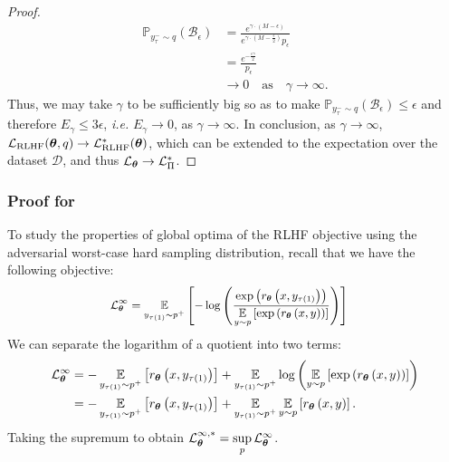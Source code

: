\begin{proof}
\begin{equation*}
\begin{aligned}
\mathbb{P}_{y^{-}_{\tau}\sim q}(\mathcal{B}_{\epsilon})&=\frac{e^{\gamma\cdot\left(M-\epsilon\right)}}{e^{\gamma\cdot\left(M-\frac{\epsilon}{2}\right)}p_{\epsilon}} \\
&= \frac{e^{-\frac{\epsilon\gamma}{2}}}{p_{\epsilon}} \\
&\rightarrow 0 \quad\text{as}\quad \gamma\rightarrow\infty.
\end{aligned}
\end{equation*}
Thus, we may take $\gamma$ to be sufficiently big so as to make $\mathbb{P}_{y^{-}_{\tau}\sim q}(\mathcal{B}_{\epsilon})\leq\epsilon$ and therefore $E_{\gamma}\leq3\epsilon$, \textit{i.e.} $E_{\gamma}\rightarrow0$, as $\gamma\rightarrow\infty$. In conclusion, as $\gamma \rightarrow \infty$, $\mathcal{L}_{\text{RLHF}}({\boldsymbol{\theta}},q)\rightarrow\mathcal{L}_{\text{RLHF}}^{*}({\boldsymbol{\theta}})$, which can be extended to the expectation over the dataset $\mathcal{D}$, and thus $\mathcal{L}_{{\boldsymbol{\theta}}} \rightarrow \mathcal{L}_{\Pi}^{*}$.
\end{proof}

\subsubsection{Proof for }
\label{sec:proof3}
To study the properties of global optima of the RLHF objective using the adversarial worst-case hard sampling distribution, recall that we have the following objective:
\begin{equation*}
\fontsize{9}{3}\selectfont{
\begin{aligned}
&\mathcal{L}_{\wm}^{\infty}=\expectation\limits_{y_{\tau(1)}\sim p^{+}}\left[-\log\left(\frac{\exp\left(r_{\wm}\left(x,y_{\tau(1)}\right)\right)}{\expectation\limits_{y\sim p}\left[\exp\left(r_{\wm}\left(x,y\right)\right)\right]}\right)\right]
\end{aligned}}
\end{equation*}
We can separate the logarithm of a quotient into two terms:
\begin{equation*}
\begin{aligned}
\mathcal{L}_{{\boldsymbol{\theta}}}^{\infty}&=-\operatorname*{\mathbb{E}}\limits_{y_{\tau(1)}\sim p^{+}}\left[r_{{\boldsymbol{\theta}}}\left(x,y_{\tau(1)}\right)\right]+\operatorname*{\mathbb{E}}\limits_{y_{\tau(1)}\sim p^{+}}\log\left(\operatorname*{\mathbb{E}}\limits_{y\sim p}\left[\exp\left(r_{{\boldsymbol{\theta}}}\left(x,y\right)\right)\right]\right) \\
&=-\operatorname*{\mathbb{E}}\limits_{y_{\tau(1)}\sim p^{+}}\left[r_{{\boldsymbol{\theta}}}\left(x,y_{\tau(1)}\right)\right]+\operatorname*{\mathbb{E}}\limits_{y_{\tau(1)}\sim p^{+}}\operatorname*{\mathbb{E}}\limits_{y\sim p}\left[r_{{\boldsymbol{\theta}}}\left(x,y\right)\right].
\end{aligned}
\end{equation*}
Taking the supremum to obtain $\mathcal{L}_{{\boldsymbol{\theta}}}^{\infty, *} = \sup\limits_{p}\mathcal{L}_{{\boldsymbol{\theta}}}^{\infty}$.


